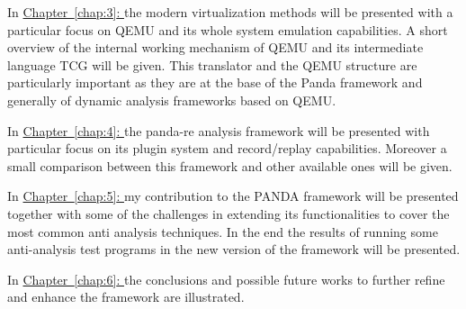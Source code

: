 \medskip
In \hyperref[chap:3]{Chapter~\ref*{chap:3}: } the modern virtualization methods will be presented with a particular focus on QEMU and its whole system emulation capabilities. A short overview of the internal working mechanism of QEMU and its intermediate language TCG will be given. This translator and the QEMU structure are particularly important as they are at the base of the Panda framework and generally of dynamic analysis frameworks based on QEMU.


\medskip
In \hyperref[chap:4]{Chapter~\ref*{chap:4}: } the panda-re analysis framework will be presented with particular focus on its plugin system and record/replay capabilities. Moreover a small comparison between this framework and other available ones will be given. 


\medskip
In \hyperref[chap:5]{Chapter~\ref*{chap:5}: }  my contribution to the PANDA framework will be presented together with some of the challenges in extending its functionalities to cover the most common anti analysis techniques. In the end the results of running some anti-analysis test programs in the new version of the framework will be presented.

\medskip
In \hyperref[chap:6]{Chapter~\ref*{chap:6}: } the conclusions and possible future works to further refine and enhance the framework are illustrated.